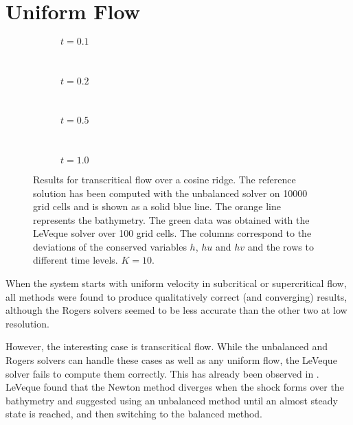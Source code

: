 \section{Uniform Flow}

\begin{figure}
  \centering
  \begin{subfigure}{\textwidth}
    \caption{$t = 0.1$}
    \label{fig:results-flow-1}
  \end{subfigure} \\
  \begin{subfigure}{\textwidth}
    \caption{$t = 0.2$}
    \label{fig:results-flow-2}
  \end{subfigure} \\
  \begin{subfigure}{\textwidth}
    \caption{$t = 0.5$}
    \label{fig:results-flow-5}
  \end{subfigure} \\
  \begin{subfigure}{\textwidth}
    \caption{$t = 1.0$}
    \label{fig:results-flow-10}
  \end{subfigure}
  \caption{Results for transcritical flow over a cosine ridge. The reference solution has been computed with the unbalanced solver on 10000 grid cells and is shown as a solid blue line. The orange line represents the bathymetry. The green data was obtained with the LeVeque solver over 100 grid cells. The columns correspond to the deviations of the conserved variables $h$, $hu$ and $hv$ and the rows to different time levels. $K = 10$.}
  \label{fig:results-flow}
\end{figure}

When the system starts with uniform velocity in subcritical or supercritical flow, all methods were found to produce qualitatively correct (and converging) results, although the Rogers solvers seemed to be less accurate than the other two at low resolution.

However, the interesting case is transcritical flow. While the unbalanced and Rogers solvers can handle these cases as well as any uniform flow, the LeVeque solver fails to compute them correctly. This has already been observed in \citet{leveque1998balancing}. LeVeque found that the Newton method diverges when the shock forms over the bathymetry and suggested using an unbalanced method until an almost steady state is reached, and then switching to the balanced method.

